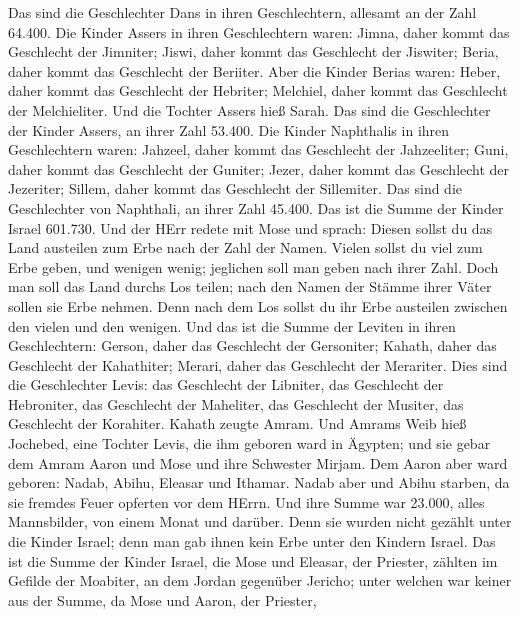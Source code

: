 Das sind die Geschlechter Dans in ihren Geschlechtern, allesamt an der
Zahl 64.400.  Die Kinder Assers in ihren Geschlechtern
waren: Jimna, daher kommt das Geschlecht der Jimniter; Jiswi, daher
kommt das Geschlecht der Jiswiter; Beria, daher kommt das Geschlecht der
Beriiter.  Aber die Kinder Berias waren: Heber, daher kommt
das Geschlecht der Hebriter; Melchiel, daher kommt das Geschlecht der
Melchieliter.  Und die Tochter Assers hieß Sarah.
 Das sind die Geschlechter der Kinder Assers, an ihrer Zahl
53.400.  Die Kinder Naphthalis in ihren Geschlechtern
waren: Jahzeel, daher kommt das Geschlecht der Jahzeeliter; Guni, daher
kommt das Geschlecht der Guniter;  Jezer, daher kommt das
Geschlecht der Jezeriter; Sillem, daher kommt das Geschlecht der
Sillemiter.  Das sind die Geschlechter von Naphthali, an
ihrer Zahl 45.400.  Das ist die Summe der Kinder Israel
601.730.  Und der HErr redete mit Mose und sprach:
 Diesen sollst du das Land austeilen zum Erbe nach der Zahl
der Namen.  Vielen sollst du viel zum Erbe geben, und
wenigen wenig; jeglichen soll man geben nach ihrer Zahl. 
Doch man soll das Land durchs Los teilen; nach den Namen der Stämme
ihrer Väter sollen sie Erbe nehmen.  Denn nach dem Los
sollst du ihr Erbe austeilen zwischen den vielen und den wenigen.
 Und das ist die Summe der Leviten in ihren Geschlechtern:
Gerson, daher das Geschlecht der Gersoniter; Kahath, daher das
Geschlecht der Kahathiter; Merari, daher das Geschlecht der Merariter.
 Dies sind die Geschlechter Levis: das Geschlecht der
Libniter, das Geschlecht der Hebroniter, das Geschlecht der Maheliter,
das Geschlecht der Musiter, das Geschlecht der Korahiter. Kahath zeugte
Amram.  Und Amrams Weib hieß Jochebed, eine Tochter Levis,
die ihm geboren ward in Ägypten; und sie gebar dem Amram Aaron und Mose
und ihre Schwester Mirjam.  Dem Aaron aber ward geboren:
Nadab, Abihu, Eleasar und Ithamar.  Nadab aber und Abihu
starben, da sie fremdes Feuer opferten vor dem HErrn.  Und
ihre Summe war 23.000, alles Mannsbilder, von einem Monat und darüber.
Denn sie wurden nicht gezählt unter die Kinder Israel; denn man gab
ihnen kein Erbe unter den Kindern Israel.  Das ist die
Summe der Kinder Israel, die Mose und Eleasar, der Priester, zählten im
Gefilde der Moabiter, an dem Jordan gegenüber Jericho; 
unter welchen war keiner aus der Summe, da Mose und Aaron, der Priester,
